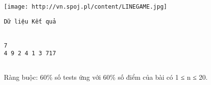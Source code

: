 \texttt{[image: http://vn.spoj.pl/content/LINEGAME.jpg]}
\begin{verbatim}
Dữ liệu Kết quả


7
4 9 2 4 1 3 717


\end{verbatim}

Ràng buộc: 60\% số tests ứng với 60\% số điểm của bài có 1 ≤ n ≤ 20.